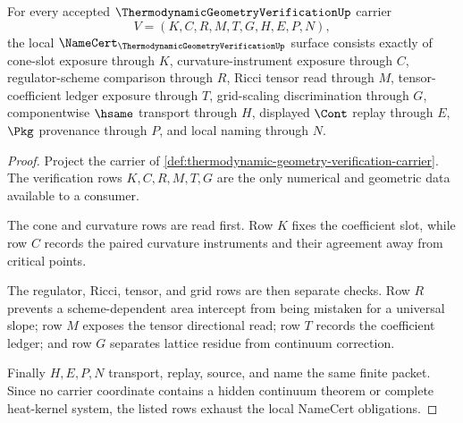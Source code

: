 \begin{theorem}
\label{thm:thermodynamic-geometry-verification-namecert-obligations}
For every accepted $\ThermodynamicGeometryVerificationUp$ carrier
$$
V=(K,C,R,M,T,G,H,E,P,N),
$$
the local $\NameCert_{\ThermodynamicGeometryVerificationUp}$ surface consists exactly of cone-slot exposure through $K$, curvature-instrument exposure through $C$, regulator-scheme comparison through $R$, Ricci tensor read through $M$, tensor-coefficient ledger exposure through $T$, grid-scaling discrimination through $G$, componentwise $\hsame$ transport through $H$, displayed $\Cont$ replay through $E$, $\Pkg$ provenance through $P$, and local naming through $N$.
\end{theorem}
\begin{proof}
Project the carrier of \autoref{def:thermodynamic-geometry-verification-carrier}. The verification rows $K,C,R,M,T,G$ are the only numerical and geometric data available to a consumer.

The cone and curvature rows are read first. Row $K$ fixes the coefficient slot, while row $C$ records the paired curvature instruments and their agreement away from critical points.

The regulator, Ricci, tensor, and grid rows are then separate checks. Row $R$ prevents a scheme-dependent area intercept from being mistaken for a universal slope; row $M$ exposes the tensor directional read; row $T$ records the coefficient ledger; and row $G$ separates lattice residue from continuum correction.

Finally $H,E,P,N$ transport, replay, source, and name the same finite packet. Since no carrier coordinate contains a hidden continuum theorem or complete heat-kernel system, the listed rows exhaust the local NameCert obligations.
\end{proof}

